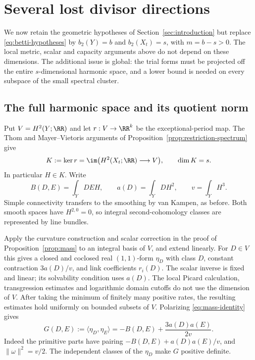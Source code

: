 \section{Several lost divisor directions}\label{sec:multiple}

We now retain the geometric hypotheses of Section~\ref{sec:introduction}
but replace \eqref{eq:betti-hypotheses} by
$b_2(Y)=b$ and $b_2(X_t)=s$, with $m=b-s>0$.
The local metric, scalar and capacity arguments above do not depend on
these dimensions. The additional issue is global: the trial forms must
be projected off the entire $s$-dimensional harmonic space, and a lower
bound is needed on every subspace of the small spectral cluster.

\subsection{The full harmonic space and its quotient norm}
Put $V=H^2(Y;\RR)$ and let $r:V\to\RR^k$ be the exceptional-period
map. The Thom and Mayer--Vietoris arguments of
Proposition~\ref{prop:restriction-spectrum} give
\[
 K:=\ker r=\im\bigl(H^2(X_t;\RR)\longrightarrow V\bigr),
 \qquad \dim K=s.
\]
In particular $H\in K$. Write
\begin{equation}\label{eq:full-intersection-forms}
 B(D,E)=\int_YDEH,\qquad a(D)=\int_YDH^2,\qquad v=\int_YH^3.
\end{equation}
Simple connectivity transfers to the smoothing by van Kampen, as before.
Both smooth spaces have $H^{2,0}=0$, so integral second-cohomology
classes are represented by line bundles.

Apply the curvature construction and scalar correction in the proof of
Proposition~\ref{prop:mass} to an integral basis of $V$, and extend
linearly. For $D\in V$ this gives a closed and coclosed real $(1,1)$-form
$\eta_D$ with class $D$, constant contraction $3a(D)/v$, and link
coefficients $r_i(D)$. The scalar inverse is fixed and linear; its
solvability condition uses $a(D)$. The local Picard calculation,
transgression estimates and logarithmic domain cutoffs do not use the
dimension of $V$. After taking the minimum of finitely many positive
rates, the resulting estimates hold uniformly on bounded subsets of $V$.
Polarizing \eqref{eq:mass-identity} gives
\begin{equation}\label{eq:full-harmonic-gram}
 G(D,E):=\langle\eta_D,\eta_E\rangle
 =-B(D,E)+\frac{3a(D)a(E)}{2v}.
\end{equation}
Indeed the primitive parts have pairing
$-B(D,E)+a(D)a(E)/v$, and $\|\omega\|^2=v/2$.
The independent classes of the $\eta_D$ make $G$ positive definite.

